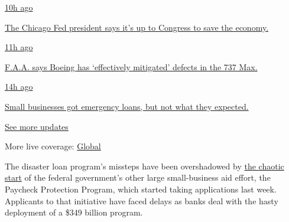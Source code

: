 \href{https://www.nytimes3xbfgragh.onion/live/2020/08/03/business/stock-market-today-coronavirus?action=click\&pgtype=Article\&state=default\&region=MAIN_CONTENT_1\&context=storylines_live_updates\#the-chicago-fed-president-says-its-up-to-congress-to-save-the-economy}{10h
ago}

\href{https://www.nytimes3xbfgragh.onion/live/2020/08/03/business/stock-market-today-coronavirus?action=click\&pgtype=Article\&state=default\&region=MAIN_CONTENT_1\&context=storylines_live_updates\#the-chicago-fed-president-says-its-up-to-congress-to-save-the-economy}{The
Chicago Fed president says it's up to Congress to save the economy.}

\href{https://www.nytimes3xbfgragh.onion/live/2020/08/03/business/stock-market-today-coronavirus?action=click\&pgtype=Article\&state=default\&region=MAIN_CONTENT_1\&context=storylines_live_updates\#faa-says-boeing-has-effectively-mitigated-defects-in-the-737-max}{11h
ago}

\href{https://www.nytimes3xbfgragh.onion/live/2020/08/03/business/stock-market-today-coronavirus?action=click\&pgtype=Article\&state=default\&region=MAIN_CONTENT_1\&context=storylines_live_updates\#faa-says-boeing-has-effectively-mitigated-defects-in-the-737-max}{F.A.A.
says Boeing has `effectively mitigated' defects in the 737 Max.}

\href{https://www.nytimes3xbfgragh.onion/live/2020/08/03/business/stock-market-today-coronavirus?action=click\&pgtype=Article\&state=default\&region=MAIN_CONTENT_1\&context=storylines_live_updates\#small-businesses-got-emergency-loans-but-not-what-they-expected}{14h
ago}

\href{https://www.nytimes3xbfgragh.onion/live/2020/08/03/business/stock-market-today-coronavirus?action=click\&pgtype=Article\&state=default\&region=MAIN_CONTENT_1\&context=storylines_live_updates\#small-businesses-got-emergency-loans-but-not-what-they-expected}{Small
businesses got emergency loans, but not what they expected.}

\href{https://www.nytimes3xbfgragh.onion/live/2020/08/03/business/stock-market-today-coronavirus?action=click\&pgtype=Article\&state=default\&region=MAIN_CONTENT_1\&context=storylines_live_updates}{See
more updates}

More live coverage:
\href{https://www.nytimes3xbfgragh.onion/2020/08/03/world/coronavirus-covid-19.html?action=click\&pgtype=Article\&state=default\&region=MAIN_CONTENT_1\&context=storylines_live_updates}{Global}

The disaster loan program's missteps have been overshadowed by
\href{https://www.nytimes3xbfgragh.onion/2020/04/07/business/coronavirus-ppp-small-business-aid.html}{the
chaotic start} of the federal government's other large small-business
aid effort, the Paycheck Protection Program, which started taking
applications last week. Applicants to that initiative have faced delays
as banks deal with the hasty deployment of a \$349 billion program.

